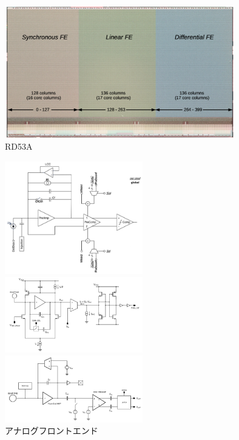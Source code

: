 \begin{figure}[bpt]\centering
\includegraphics[width=10cm]{fechip_rd53a}
\caption[RD53A]{RD53A\cite{2-1}}
\label{fechip_rd53a}
\end{figure}

\begin{figure}[bpt]
  \begin{center}
  \begin{minipage}{0.33\hsize}
    \includegraphics[width=6cm]{diff_fe}
  \end{minipage}
  \begin{minipage}{0.33\hsize}
    \includegraphics[width=6cm]{lin_fe}
  \end{minipage}
  \begin{minipage}{0.33\hsize}
    \includegraphics[width=6cm]{syn_fe}
  \end{minipage}
  \caption[アナログフロントエンド]{アナログフロントエンド\cite{2-1}}
  \label{analog_fe}
  \end{center}
\end{figure}

